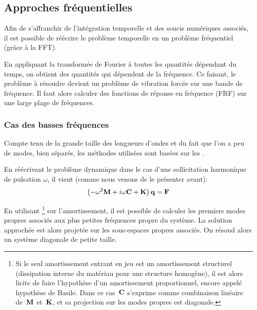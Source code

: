 \medskip
\subsection{Approches fréquentielles}

Afin de s'affranchir de l'intégration temporelle et des soucis numériques associés, il est
possible de réécrire le problème temporelle en un problème fréquentiel (grâce à
la FFT).


\medskip
En appliquant la transformée de Fourier
à toutes les quantités dépendant du temps,
on obtient des quantités qui dépendent de la fréquence.
Ce faisant, le problème à résoudre devient un problème de vibration
forcée sur une bande de fréquence.
Il faut alors calculer des fonctions de réponse en fréquence (FRF) sur une large plage
de fréquences.

\medskip
\subsubsection{Cas des basses fréquences}

Compte tenu de la grande taille des longueurs d'ondes et du fait que l'on a peu de modes, bien séparés,
les méthodes utilisées sont basées sur les .

En réécrivant le problème dynamique dans le cas d'une sollicitation harmonique de pulsation
$\omega$, il vient (comme nous venons de le présenter avant):
\begin{equation}
\left(-\omega^2\MM{M}+i\omega \MM{C}+\MM{K}\right)\VV{q} = \VV{F}
\end{equation}

En utilisant \footnote{%
Si le seul amortissement entrant en jeu est un amortissement structurel (dissipation
interne du matériau pour une structure homogène), il est alors licite de faire
l'hypothèse d'un amortissement proportionnel, encore appelé hypothèse de
Basile. Dans ce cas~$\MM{C}$ s'exprime comme combinaison linéaire de~$\MM{M}$ et~$\MM{K}$,
et sa projection sur les modes propres est diagonale.
} sur l'amortissement, il est possible de calculer les premiers modes propres
associés aux plus petites fréquences propre du système.
La solution approchée est alors projetée sur les sous-espaces propres associés.
On résoud alors un système diagonale de petite taille.

